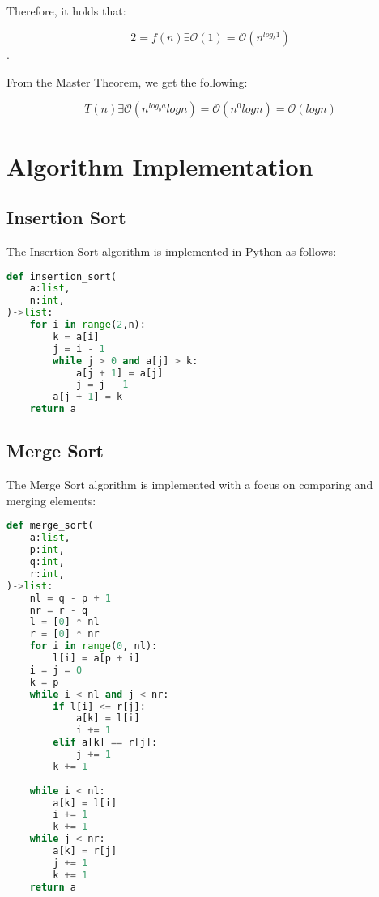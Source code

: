 \documentclass{article}
\begin{document}
\\

Therefore, it holds that:

$$2 = f(n)\exists \mathcal{O}(1) = \mathcal{O}(n^{log_b 1})$$.

From the Master Theorem, we get the following:

$$T(n) \exists \mathcal{O}(n^{log_b a} log n) = \mathcal{O}(n^0 log n) = \mathcal{O}(log n)$$


\section{Algorithm Implementation}
\subsection{Insertion Sort}
The Insertion Sort algorithm is implemented in Python as follows:
\begin{lstlisting}[language=Python]
def insertion_sort(
    a:list,
    n:int,
)->list:
    for i in range(2,n):
        k = a[i]
        j = i - 1
        while j > 0 and a[j] > k:
            a[j + 1] = a[j]
            j = j - 1
        a[j + 1] = k
    return a
\end{lstlisting}

\subsection{Merge Sort}
The Merge Sort algorithm is implemented with a focus on comparing and merging elements:
\begin{lstlisting}[language=Python]
def merge_sort(
    a:list,
    p:int,
    q:int,
    r:int,
)->list:
    nl = q - p + 1
    nr = r - q
    l = [0] * nl
    r = [0] * nr
    for i in range(0, nl):
        l[i] = a[p + i]
    i = j = 0
    k = p
    while i < nl and j < nr:
        if l[i] <= r[j]:
            a[k] = l[i]
            i += 1
        elif a[k] == r[j]:
            j += 1
        k += 1
    
    while i < nl:
        a[k] = l[i]
        i += 1
        k += 1
    while j < nr:
        a[k] = r[j]
        j += 1
        k += 1
    return a
\end{lstlisting}

\printbibliography
\end{document}
